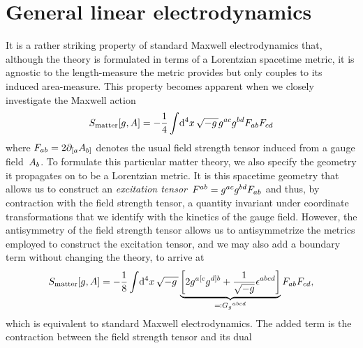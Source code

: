 
\section{General linear electrodynamics}\label{sec:gled}


It is a rather striking property of standard Maxwell electrodynamics that, although the theory is formulated in terms of a Lorentzian spacetime metric, it is agnostic to the length-measure the metric provides but only couples to its induced area-mea\-sure. This property becomes apparent when we closely investigate the Maxwell action
\begin{equation}\label{eq:maxwell_action}
	\actmatter[\met,\empot]=-\frac{1}{4}\intd{^4\coordx}\sqrtmet\met^{ac}\met^{bd}\fstr_{ab}\fstr_{cd}
\end{equation}
where $F_{ab}=2\partial_{[ a}A_{b]}$ denotes the usual field strength tensor induced from a gauge field~$A_b$. To formulate this particular matter theory, we also specify the geometry it propagates on to be a Lorentzian metric. It is this spacetime geometry that allows us to construct an \emph{excitation tensor}~$F^{ab}=g^{ac}g^{bd}F_{ab}$ and thus, by contraction with the field strength tensor, a quantity invariant under coordinate transformations that we identify with the kinetics of the gauge field. However, the antisymmetry of the field strength tensor allows us to antisymmetrize the metrics employed to construct the excitation tensor, and we may also add a boundary term without changing the theory, to arrive at
\begin{equation}\label{eq:maxwell_action_mod}
	\actmatter[\met,\empot]=-\frac{1}{8}\intd{^4\coordx}\sqrtmet\underbrace{\left[2\met^{a\antisyml c}\met^{d\antisymr b}+\frac{1}{\sqrt{-\met}}\levciv^{abcd}\right]}_{\eqdef{\armet_\met}^{abcd}}\fstr_{ab}\fstr_{cd}
	\eqpunct{,}
\end{equation}
which is equivalent to standard Maxwell electrodynamics. The added term is the contraction between the field strength tensor and its dual
